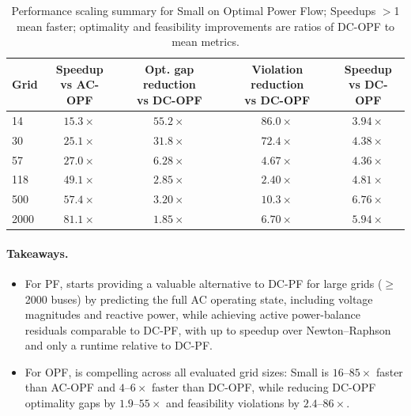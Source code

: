 \begin{table}
\centering
\scriptsize
\setlength{\tabcolsep}{4pt}
\renewcommand{\arraystretch}{1.2}
\begin{tabular}{@{}l c c c c@{}}
\toprule
Grid
& \shortstack{Speedup\\vs AC-OPF}
& \shortstack{Opt. gap reduction\\vs DC-OPF}
& \shortstack{Violation reduction\\vs DC-OPF}
& \shortstack{Speedup\\vs DC-OPF} \\
\midrule
  14 & $15.3\times$ & $55.2\times$ & $86.0\times$ & $3.94\times$ \\
  30 & $25.1\times$ & $31.8\times$ & $72.4\times$ & $4.38\times$ \\
  57 & $27.0\times$ & $6.28\times$ & $4.67\times$ & $4.36\times$ \\
 118 & $49.1\times$ & $2.85\times$ & $2.40\times$ & $4.81\times$ \\
 500 & $57.4\times$ & $3.20\times$ & $10.3\times$ & $6.76\times$ \\
2000 & $81.1\times$ & $1.85\times$ & $6.70\times$ & $5.94\times$ \\
\bottomrule
\end{tabular}
\caption{Performance scaling summary for \genco Small on Optimal Power Flow; Speedups $>$1 mean faster; optimality and feasibility improvements are ratios of DC-OPF to \genco mean metrics.}
\label{tab:opf_selected_genco_tradeoff}
\end{table}



\begin{boxH}
\paragraph{Takeaways.}

\begin{itemize}


\item For PF, \genco starts providing a valuable alternative to DC-PF for large grids ($\geq$2000 buses) by predicting the full AC operating state, including voltage magnitudes and reactive power, while achieving active power-balance residuals comparable to DC-PF, with up to \maxpfspeedups speedup over Newton--Raphson and only a \dcpfspeedupovergenco runtime relative to DC-PF.

\item For OPF, \genco is compelling across all evaluated grid sizes: Small is $16$--$85\times$ faster than AC-OPF and $4$--$6\times$ faster than DC-OPF, while reducing DC-OPF optimality gaps by $1.9$--$55\times$ and feasibility violations by $2.4$--$86\times$.



\end{itemize}
\end{boxH}